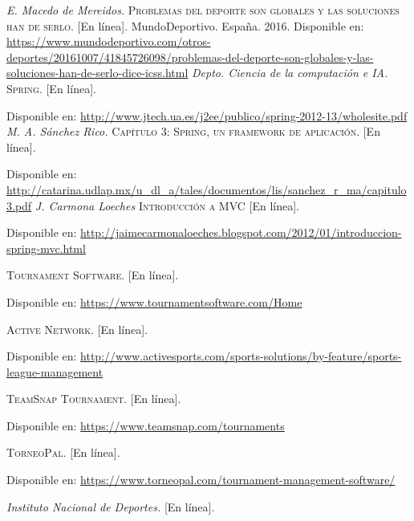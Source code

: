 \begin{thebibliography}{}
	\textit{E. Macedo de Mereidos.}
	\textsc{Problemas del deporte son globales y las soluciones han de serlo.} [En línea]. 
	MundoDeportivo. España. 2016.
	\linebreak
	Disponible en: 
	\url{https://www.mundodeportivo.com/otros-deportes/20161007/41845726098/problemas-del-deporte-son-globales-y-las-soluciones-han-de-serlo-dice-icss.html}
	\textit{Depto. Ciencia de la computación e IA.}
	\textsc{Spring.} [En línea]. 
	
	\linebreak
	Disponible en:
	\url{http://www.jtech.ua.es/j2ee/publico/spring-2012-13/wholesite.pdf}
	\textit{M. A. Sánchez Rico.}
	\textsc{Capítulo 3: Spring, un framework de aplicación.} [En línea].
	
	\linebreak
	Disponible en:
	\url{http://catarina.udlap.mx/u_dl_a/tales/documentos/lis/sanchez_r_ma/capitulo3.pdf}
	\textit{J. Carmona Loeches}
	\textsc{Introducción a MVC} [En línea]. 
	
	\linebreak
	Disponible en: 
	\url{http://jaimecarmonaloeches.blogspot.com/2012/01/introduccion-spring-mvc.html}
	
	\textit{}
	\textsc{Tournament Software.} [En línea].
	
	\linebreak
	Disponible en: 
	\url{https://www.tournamentsoftware.com/Home}
	
	\textit{}
	\textsc{Active Network.} [En línea].
	
	\linebreak
	Disponible en: 
	\url{http://www.activesports.com/sports-solutions/by-feature/sports-league-management}
	
	\textit{}
	\textsc{TeamSnap Tournament.} [En línea].
	
	\linebreak
	Disponible en:
	\url{https://www.teamsnap.com/tournaments}
	
	\textit{}
	\textsc{TorneoPal.} [En línea].
	
	\linebreak
	Disponible en: 
	\url{ https://www.torneopal.com/tournament-management-software/}
	
	\textit{Instituto Nacional de Deportes.}
	\textsc{}[En línea].
	

\end{thebibliography}
